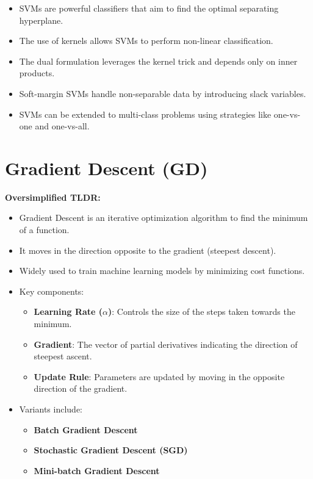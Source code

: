 \documentclass{article}
\begin{document}
\begin{itemize}
    \item SVMs are powerful classifiers that aim to find the optimal separating hyperplane.
    \item The use of kernels allows SVMs to perform non-linear classification.
    \item The dual formulation leverages the kernel trick and depends only on inner products.
    \item Soft-margin SVMs handle non-separable data by introducing slack variables.
    \item SVMs can be extended to multi-class problems using strategies like one-vs-one and one-vs-all.
\end{itemize}

\section{Gradient Descent (GD)}

\textbf{Oversimplified TLDR:}
\begin{itemize}
    \item Gradient Descent is an iterative optimization algorithm to find the minimum of a function.
    \item It moves in the direction opposite to the gradient (steepest descent).
    \item Widely used to train machine learning models by minimizing cost functions.
    \item Key components:
    \begin{itemize}
        \item \textbf{Learning Rate ($\alpha$)}: Controls the size of the steps taken towards the minimum.
        \item \textbf{Gradient}: The vector of partial derivatives indicating the direction of steepest ascent.
        \item \textbf{Update Rule}: Parameters are updated by moving in the opposite direction of the gradient.
    \end{itemize}
    \item Variants include:
    \begin{itemize}
        \item \textbf{Batch Gradient Descent}
        \item \textbf{Stochastic Gradient Descent (SGD)}
        \item \textbf{Mini-batch Gradient Descent}
    \end{itemize}
\end{itemize}
\end{document}
